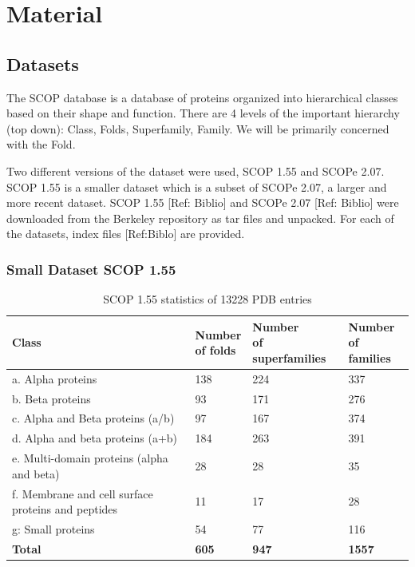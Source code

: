 \documentclass[12pt, a4paper, twocolumn, fullpage]{article}
\theoremstyle{plain}
\theoremstyle{definition}
\theoremstyle{remark}
\begin{document}
\section{Material}

\subsection{Datasets}

The SCOP database is a database of proteins organized into hierarchical classes based on their shape and function. There are 4 levels of the important hierarchy (top down): Class, Folds, Superfamily, Family. We will be primarily concerned with the Fold.

Two different versions of the dataset were used, SCOP 1.55 and SCOPe 2.07. SCOP 1.55 is a smaller dataset which is a subset of SCOPe 2.07, a larger and more recent dataset. SCOP 1.55 [Ref: Biblio] and SCOPe 2.07 [Ref: Biblio] were downloaded from the Berkeley repository as tar files and unpacked. For each of the datasets, index files [Ref:Biblo] are provided.

\subsubsection{Small Dataset SCOP 1.55}

\begin{table}[h]
    \centering
    \begin{tabular}{| l | l | l | l |}
        \hline 
        Class & \makecell{Number \\ of folds} & \makecell{Number  \\ of superfamilies} & \makecell{Number \\ of families} \\ \hline
        a. Alpha proteins & 138 & 224 & 337 \\ \hline
        b. Beta proteins & 93 & 171 & 276 \\ \hline
        c. Alpha and Beta proteins (a/b) & 97 & 167 & 374 \\ \hline
        d. Alpha and beta proteins (a+b) & 184 & 263 & 391 \\ \hline
        e. Multi-domain proteins (alpha and beta) & 28 & 28 & 35 \\ \hline
        \makecell[l]{f. Membrane and cell surface \\ proteins and peptides} & 11 & 17 & 28 \\ \hline
        g: Small proteins & 54 & 77 & 116 \\ \hline
        \textbf{Total} & \textbf{605} & \textbf{947} & \textbf{1557}  \\ \hline
        \hline
    \end{tabular}
    \caption{ SCOP 1.55 statistics of 13228 PDB entries}
    \label{}
\end{table}
\end{document}
